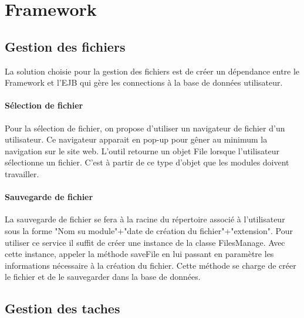 \section{Framework}

\subsection{Gestion des fichiers}

La solution choisie pour la gestion des fichiers est de créer un dépendance entre le Framework et l'EJB qui gère les connections à la base de données utilisateur.\\

\paragraph*{Sélection de fichier}

Pour la sélection de fichier, on propose d'utiliser un navigateur de fichier d'un utilisateur. Ce navigateur apparait en pop-up pour gêner au minimum la navigation sur le site web. L'outil retourne un objet File lorsque l'utilisateur sélectionne un fichier. C'est à partir de ce type d'objet que les modules doivent travailler.\\

\paragraph*{Sauvegarde de fichier}

La sauvegarde de fichier se fera à la racine du répertoire associé à l'utilisateur sous la forme "Nom su module"+"date de création du fichier"+"extension". Pour utiliser ce service il suffit de créer une instance de la classe FilesManage. Avec cette instance, appeler la méthode saveFile en lui passant en paramètre les informations nécessaire à la création du fichier. Cette méthode se charge de créer le fichier et de le sauvegarder dans la base de données.\\

\subsection{Gestion des taches}

